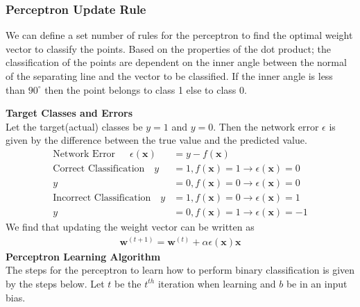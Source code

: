 \subsubsection{Perceptron Update Rule}
We can define a set number of rules for the perceptron to find the optimal weight vector to classify the points. Based on the properties of the dot product; the classification of the points are dependent on the inner angle between the normal of the separating line and the vector to be classified. If the inner angle is less than $90^\circ$ then the point belongs to class 1 else to class 0.\vspace{10mm}

\noindent \textbf{Target Classes and Errors} \\
Let the target(actual) classes be $y=1$ and $y=0$. Then the network error ${\epsilon}$ is given by the difference between the true value and the predicted value.
\begin{align*}
  \text{Network Error } \, \, \, \, \, \, \, {\epsilon}(\textbf{x}) &= y - f(\textbf{x})  \\
  \text{Correct Classification } \, \, \, \, y&=1, f(\textbf{x})=1 \rightarrow {\epsilon}(\textbf{x})=0 \\
  y&=0, f(\textbf{x})=0 \rightarrow {\epsilon}(\textbf{x})=0 \\
  \text{Incorrect Classification } \, \, \, \, y&=1, f(\textbf{x})=0 \rightarrow {\epsilon}(\textbf{x})=1 \\
  y&=0, f(\textbf{x})=1 \rightarrow {\epsilon}(\textbf{x})=-1
\end{align*}
We find that updating the weight vector can be written as
\begin{align}
  \textbf{w}^{(t+1)} = \textbf{w}^{(t)} + \alpha\epsilon(\textbf{x})\textbf{x}
\end{align}
\textbf{Perceptron Learning Algorithm}\\
The steps for the perceptron to learn how to perform binary classification is given by the steps below. Let $t$ be the $t^{th}$ iteration when learning and $b$ be in an input bias.

